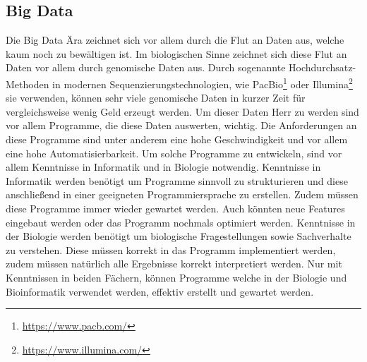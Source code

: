 \documentclass{scrartcl}
\begin{document}
\subsection{Big Data}
\label{sec-2-2}
Die Big Data Ära zeichnet sich vor allem durch die Flut an Daten aus, welche kaum noch zu bewältigen ist. Im biologischen Sinne zeichnet sich diese 
Flut an Daten vor allem durch genomische Daten aus. Durch sogenannte Hochdurchsatz-Methoden in modernen Sequenzierungstechnologien, wie PacBio\footnote{\url{https://www.pacb.com/}} oder Illumina\footnote{\url{https://www.illumina.com/}}
sie verwenden, können sehr viele genomische Daten in kurzer Zeit für vergleichsweise wenig Geld erzeugt werden. Um dieser Daten Herr zu werden sind vor allem
Programme, die diese Daten auswerten, wichtig. Die Anforderungen an diese Programme sind unter anderem eine hohe Geschwindigkeit und vor allem eine hohe 
Automatisierbarkeit. Um solche Programme zu entwickeln, sind vor allem Kenntnisse in Informatik und in Biologie notwendig. Kenntnisse in Informatik
werden benötigt um Programme sinnvoll zu strukturieren und diese anschließend in einer geeigneten Programmiersprache zu erstellen. Zudem müssen diese
Programme immer wieder gewartet werden. Auch könnten neue Features eingebaut werden oder das Programm nochmals optimiert werden. Kenntnisse in der Biologie
werden benötigt um biologische Fragestellungen sowie Sachverhalte zu verstehen. Diese müssen korrekt in das Programm implementiert werden, zudem müssen 
natürlich alle Ergebnisse korrekt interpretiert werden. Nur mit Kenntnissen in beiden Fächern, können Programme welche in der Biologie und Bioinformatik verwendet
werden, effektiv erstellt und gewartet werden.  
\end{document}
